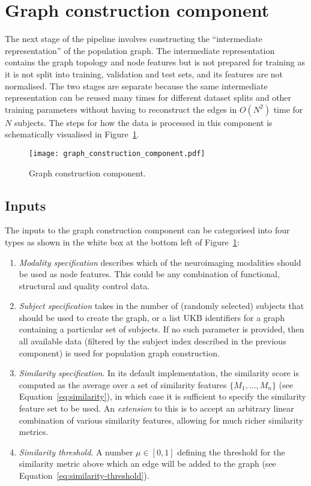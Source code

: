 \section{Graph construction component}
\label{section:graph-construction}
The next stage of the pipeline involves constructing the ``intermediate representation'' of the population graph. The intermediate representation contains the graph topology and node features but is not prepared for training as it is not split into training, validation and test sets, and its features are not normalised. The two stages are separate because the same intermediate representation can be reused many times for different dataset splits and other training parameters without having to reconstruct the edges in $O(N^2)$ time for $N$ subjects. The steps for how the data is processed in this component is schematically visualised in Figure~\ref{graph-construction-component}.

\begin{figure}[h]
    \texttt{[image: graph\_construction\_component.pdf]}
    \caption{Graph construction component.}\label{graph-construction-component}
\end{figure}

\subsection{Inputs}
The inputs to the graph construction component can be categorised into four types as shown in the white box at the bottom left of Figure~\ref{graph-construction-component}:
\begin{enumerate}
    \item \textit{Modality specification} describes which of the neuroimaging modalities should be used as node features. This could be any combination of functional, structural and quality control data.
    \item \textit{Subject specification} takes in the number of (randomly selected) subjects that should be used to create the graph, or a list UKB identifiers for a graph containing a particular set of subjects. If no such parameter is provided, then all available data (filtered by the subject index described in the previous component) is used for population graph construction.
    \item \textit{Similarity specification}. 
    In its default implementation, the similarity score is computed as the average over a set of similarity features $\{M_1, \dots, M_n\}$ (see Equation~\eqref{eq:similarity}), in which case it is sufficient to specify the similarity feature set to be used. An \textit{extension} to this is to accept an arbitrary linear combination of various similarity features, allowing for much richer similarity metrics. 
    \item \textit{Similarity threshold}. A number $\mu \in [0,1]$ defining the threshold for the similarity metric above which an edge will be added to the graph (see Equation~\eqref{eq:similarity-threshold}).
\end{enumerate}


